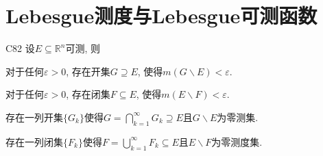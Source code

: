 \section{Lebesgue测度与Lebesgue可测函数}
\begin{theorem}{}{C82}
设\(E\subseteq \mathbb{R}^n\)可测, 则\begin{quizs}
\item 对于任何\(\varepsilon>0\), 存在开集\(G\supseteq E\), 使得\(m(G\backslash E)<\varepsilon\).
\item 对于任何\(\varepsilon>0\), 存在闭集\(F\subseteq E\), 使得\(m(E\backslash F)<\varepsilon\).
\item 存在一列开集\(\{G_k\}\)使得\(G=\bigcap_{k=1}^{\infty}G_k\supseteq E\)且\(G\backslash E\)为零测集.
\item 存在一列闭集\(\{F_k\}\)使得\(F=\bigcup_{k=1}^{\infty}F_k\subseteq E\)且\(E\backslash F\)为零测度集.
\end{quizs}
\end{theorem}

